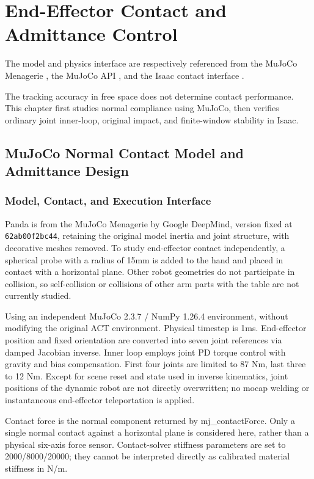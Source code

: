 \chapter{End-Effector Contact and Admittance Control}
The model and physics interface are respectively referenced from the MuJoCo Menagerie \cite{menagerie}, the MuJoCo API \cite{mujoco}, and the Isaac contact interface \cite{contact}.


The tracking accuracy in free space does not determine contact performance. This chapter first studies normal compliance using MuJoCo, then verifies ordinary joint inner-loop, original impact, and finite-window stability in Isaac.

\section{MuJoCo Normal Contact Model and Admittance Design}

\label{stage:s09}

\subsection{Model, Contact, and Execution Interface}\label{s09-detail-1}

Panda is from the MuJoCo Menagerie by Google DeepMind, version fixed at \texttt{62ab00f2bc44}, retaining the original model inertia and joint structure, with decorative meshes removed. To study end-effector contact independently, a spherical probe with a radius of 15mm is added to the hand and placed in contact with a horizontal plane. Other robot geometries do not participate in collision, so self-collision or collisions of other arm parts with the table are not currently studied.

Using an independent MuJoCo 2.3.7 / NumPy 1.26.4 environment, without modifying the original ACT environment. Physical timestep is 1ms. End-effector position and fixed orientation are converted into seven joint references via damped Jacobian inverse. Inner loop employs joint PD torque control with gravity and bias compensation. First four joints are limited to 87 Nm, last three to 12 Nm. Except for scene reset and state used in inverse kinematics, joint positions of the dynamic robot are not directly overwritten; no mocap welding or instantaneous end-effector teleportation is applied.

Contact force is the normal component returned by mj\_contactForce. Only a single normal contact against a horizontal plane is considered here, rather than a physical six-axis force sensor. Contact-solver stiffness parameters are set to 2000/8000/20000; they cannot be interpreted directly as calibrated material stiffness in N/m.

